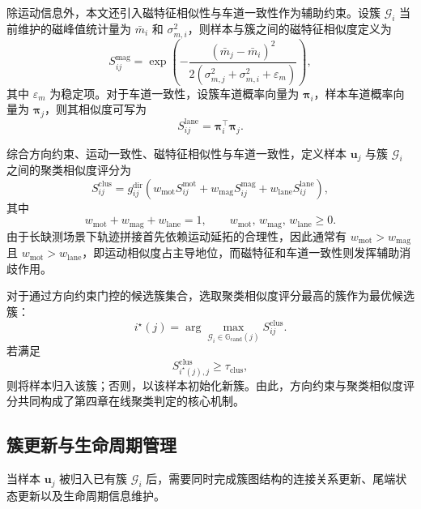 \documentclass{xdupgthesis}
\begin{document}
除运动信息外，本文还引入磁特征相似性与车道一致性作为辅助约束。设簇 $\mathcal{G}_i$ 当前维护的磁峰值统计量为 $\bar m_i$ 和 $\sigma_{m,i}^{2}$，则样本与簇之间的磁特征相似度定义为
\begin{equation}
	S_{ij}^{\mathrm{mag}}
	=
	\exp\!\left(
	-\frac{
		(\bar m_j-\bar m_i)^2
	}{
		2\left(\sigma_{m,j}^{2}+\sigma_{m,i}^{2}+\varepsilon_m\right)
	}
	\right),
\end{equation}
其中 $\varepsilon_m$ 为稳定项。对于车道一致性，设簇车道概率向量为 $\boldsymbol{\pi}_i$，样本车道概率向量为 $\boldsymbol{\pi}_j$，则其相似度可写为
\begin{equation}
	S_{ij}^{\mathrm{lane}}
	=
	\boldsymbol{\pi}_i^{\top}\boldsymbol{\pi}_j.
\end{equation}

综合方向约束、运动一致性、磁特征相似性与车道一致性，定义样本 $\mathbf{u}_j$ 与簇 $\mathcal{G}_i$ 之间的聚类相似度评分为
\begin{equation}
	S_{ij}^{\mathrm{clus}}
	=
	g_{ij}^{\mathrm{dir}}
	\left(
	w_{\mathrm{mot}}S_{ij}^{\mathrm{mot}}
	+
	w_{\mathrm{mag}}S_{ij}^{\mathrm{mag}}
	+
	w_{\mathrm{lane}}S_{ij}^{\mathrm{lane}}
	\right),
\end{equation}
其中
\begin{equation}
	w_{\mathrm{mot}}+w_{\mathrm{mag}}+w_{\mathrm{lane}}=1,\qquad
	w_{\mathrm{mot}},\,w_{\mathrm{mag}},\,w_{\mathrm{lane}}\ge 0.
\end{equation}
由于长缺测场景下轨迹拼接首先依赖运动延拓的合理性，因此通常有 $w_{\mathrm{mot}}>w_{\mathrm{mag}}$ 且 $w_{\mathrm{mot}}>w_{\mathrm{lane}}$，即运动相似度占主导地位，而磁特征和车道一致性则发挥辅助消歧作用。

对于通过方向约束门控的候选簇集合，选取聚类相似度评分最高的簇作为最优候选簇：
\begin{equation}
	i^{\star}(j)
	=
	\arg\max_{\mathcal{G}_i\in\mathbb{G}_{\mathrm{cand}}(j)}
	S_{ij}^{\mathrm{clus}}.
\end{equation}
若满足
\begin{equation}
	S_{i^{\star}(j),j}^{\mathrm{clus}} \ge \tau_{\mathrm{clus}},
\end{equation}
则将样本归入该簇；否则，以该样本初始化新簇。由此，方向约束与聚类相似度评分共同构成了第四章在线聚类判定的核心机制。

\subsection{簇更新与生命周期管理}

当样本 $\mathbf{u}_j$ 被归入已有簇 $\mathcal{G}_i$ 后，需要同时完成簇图结构的连接关系更新、尾端状态更新以及生命周期信息维护。
\end{document}
